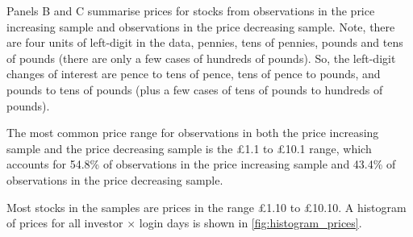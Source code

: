Panels B and C summarise prices for stocks from observations in the price increasing sample and observations in the price decreasing sample. Note, there are four units of left-digit in the data, pennies, tens of pennies, pounds and tens of pounds (there are only a few cases of hundreds of pounds). So, the left-digit changes of interest are pence to tens of pence, tens of pence to pounds, and pounds to tens of pounds (plus a few cases of tens of pounds to hundreds of pounds). 

The most common price range for observations in both the price increasing sample and the price decreasing sample is the \pounds1.1 to \pounds10.1 range, which accounts for 54.8\% of observations in the price increasing sample and 43.4\% of observations in the price decreasing sample. 

Most stocks in the samples are prices in the range \pounds1.10 to \pounds10.10. A histogram of prices for all investor $\times$ login days is shown in \ref{fig:histogram_prices}.


